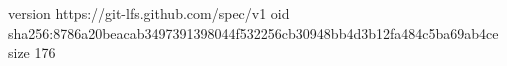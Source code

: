 version https://git-lfs.github.com/spec/v1
oid sha256:8786a20beacab3497391398044f532256cb30948bb4d3b12fa484c5ba69ab4ce
size 176
